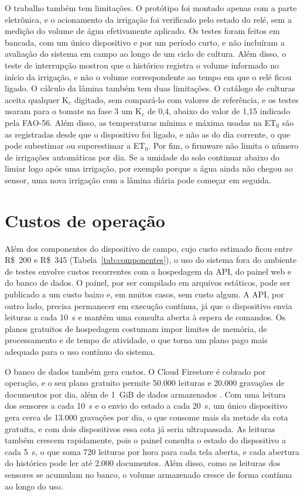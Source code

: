 O trabalho também tem limitações. O protótipo foi montado apenas com a parte eletrônica, e o acionamento da irrigação foi verificado pelo estado do relé, sem a medição do volume de água efetivamente aplicado. Os testes foram feitos em bancada, com um único dispositivo e por um período curto, e não incluíram a avaliação do sistema em campo ao longo de um ciclo de cultura. Além disso, o teste de interrupção mostrou que o histórico registra o volume informado no início da irrigação, e não o volume correspondente ao tempo em que o relé ficou ligado. O cálculo da lâmina também tem duas limitações. O catálogo de culturas aceita qualquer K$_c$ digitado, sem compará-lo com valores de referência, e os testes usaram para o tomate na fase 3 um K$_c$ de 0,4, abaixo do valor de 1,15 indicado pela FAO-56. Além disso, as temperaturas mínima e máxima usadas na ET$_0$ são as registradas desde que o dispositivo foi ligado, e não as do dia corrente, o que pode subestimar ou superestimar a ET$_0$. Por fim, o firmware não limita o número de irrigações automáticas por dia. Se a umidade do solo continuar abaixo do limiar logo após uma irrigação, por exemplo porque a água ainda não chegou ao sensor, uma nova irrigação com a lâmina diária pode começar em seguida.

\section{Custos de operação}
\label{sec:custos-operacao}

Além dos componentes do dispositivo de campo, cujo custo estimado ficou entre R\$~200 e R\$~345 (Tabela~\ref{tab:componentes}), o uso do sistema fora do ambiente de testes envolve custos recorrentes com a hospedagem da API, do painel web e do banco de dados. O painel, por ser compilado em arquivos estáticos, pode ser publicado a um custo baixo e, em muitos casos, sem custo algum. A API, por outro lado, precisa permanecer em execução contínua, já que o dispositivo envia leituras a cada 10~s e mantém uma consulta aberta à espera de comandos. Os planos gratuitos de hospedagem costumam impor limites de memória, de processamento e de tempo de atividade, o que torna um plano pago mais adequado para o uso contínuo do sistema.

O banco de dados também gera custos. O Cloud Firestore é cobrado por operação, e o seu plano gratuito permite 50.000 leituras e 20.000 gravações de documentos por dia, além de 1~GiB de dados armazenados \cite{firestorepricing2026}. Com uma leitura dos sensores a cada 10~s e o envio do estado a cada 20~s, um único dispositivo gera cerca de 13.000 gravações por dia, o que consome mais da metade da cota gratuita, e com dois dispositivos essa cota já seria ultrapassada. As leituras também crescem rapidamente, pois o painel consulta o estado do dispositivo a cada 5~s, o que soma 720 leituras por hora para cada tela aberta, e cada abertura do histórico pode ler até 2.000 documentos. Além disso, como as leituras dos sensores se acumulam no banco, o volume armazenado cresce de forma contínua ao longo do uso.

